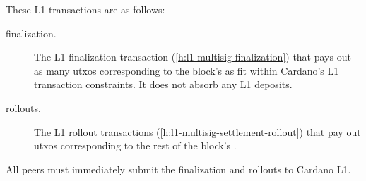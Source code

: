 \documentclass[../hydrozoa.tex]{subfiles}
\begin{document}
These L1 transactions are as follows:
\begin{description}
  \item[finalization.] The L1 finalization transaction (\cref{h:l1-multisig-finalization}) that pays out as many utxos corresponding to the block's  as fit within Cardano's L1 transaction constraints.
    It does not absorb any L1 deposits.
  \item[rollouts.] The L1 rollout transactions (\cref{h:l1-multisig-settlement-rollout}) that pay out utxos corresponding to the rest of the block's .
\end{description}

All peers must immediately submit the finalization and rollouts to Cardano L1.
\end{document}
